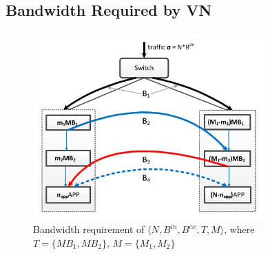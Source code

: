\documentclass[review]{elsarticle}
\begin{document}
\subsection{Bandwidth Required by VN}


\begin{figure}
	\centering
	     \includegraphics[width=3.5in]{fig/bandwidth_requirement3.pdf}
	\caption{Bandwidth requirement of $\langle N,B^{in},B^{ex},T,M\rangle$, where $T=\{MB_1,MB_2\}$, $M=\{M_1,M_2\}$}
	\label{fig:bw}
\end{figure}
\end{document}
